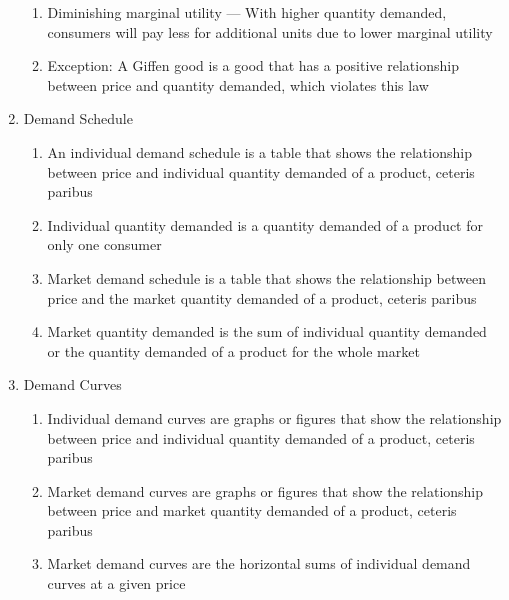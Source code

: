 \documentclass[12pt]{article}
\begin{document}
\begin{enumerate}
\begin{enumerate}
          \item Diminishing marginal utility — With higher quantity demanded, consumers will pay less for additional units due to lower marginal utility
            
          \item Exception: A Giffen good is a good that has a positive relationship between price and quantity demanded, which violates this law

        \end{enumerate}

      \item Demand Schedule

        \begin{enumerate}

          \item An individual demand schedule is a table that shows the relationship between price and individual quantity demanded of a product, ceteris paribus

          \item Individual quantity demanded is a quantity demanded of a product for only one consumer

          \item Market demand schedule is a table that shows the relationship between price and the market quantity demanded of a product, ceteris paribus

          \item Market quantity demanded is the sum of individual quantity demanded or the quantity demanded of a product for the whole market

        \end{enumerate}

      \item Demand Curves

        \begin{enumerate}

          \item Individual demand curves are graphs or figures that show the relationship between price and individual quantity demanded of a product, ceteris paribus

          \item Market demand curves are graphs or figures that show the relationship between price and market quantity demanded of a product, ceteris paribus

          \item Market demand curves are the horizontal sums of individual demand curves at a given price


\end{enumerate}
\end{enumerate}
\end{document}

